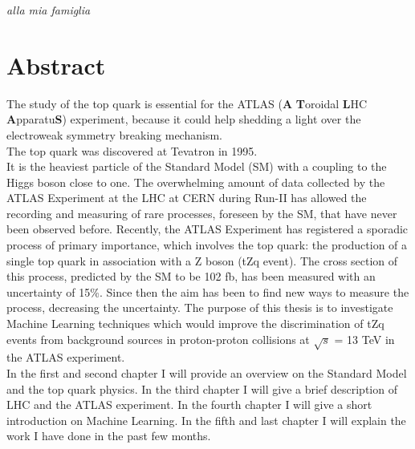 \documentclass[a4paper,11pt,twoside]{book}
\begin{document}



\cleardoublepage\thispagestyle{empty} 
\vspace*{1cm} 
\textit{
\flushright
alla mia famiglia
\vfill
}



\chapter*{\centering Abstract}
\begin{center}


The study of the top quark is essential for the ATLAS (\textbf{A} \textbf{T}oroidal \textbf{L}HC \textbf{A}pparatu\textbf{S})  experiment, because it could help shedding a light over the electroweak symmetry breaking mechanism. \\
The top quark was discovered at Tevatron in 1995. \\
It is the heaviest particle of the Standard Model (SM) with a coupling to the Higgs boson close to one.
The overwhelming amount of data collected by the ATLAS Experiment at the LHC at CERN during Run-II has allowed the recording and measuring of rare processes, foreseen by the SM, that have never been observed before.
Recently, the ATLAS Experiment has registered a sporadic process of primary importance, which involves the top quark: the production of a single top quark in association with a Z boson (tZq event).
The cross section of this process, predicted by the SM to be 102 fb, has been measured with an uncertainty of 15\%.
Since then the aim has been to find new ways to measure the process, decreasing the uncertainty.
The purpose of this thesis is to investigate Machine Learning techniques which would improve the discrimination of tZq events from background sources in proton-proton collisions at $\sqrt{s}$ = 13 TeV in the ATLAS experiment. \\
In the first and second chapter I will provide an overview on the Standard Model and the top quark physics.
In the third chapter I will give a brief description of LHC and the ATLAS experiment.
In the fourth chapter I will give a short introduction on Machine Learning.
In the fifth and last chapter I will explain the work I have done in the past few months.

\end{center}


\newpage\null\thispagestyle{empty}\newpage
\tableofcontents
\newpage\null\thispagestyle{empty}\newpage
\end{document}
